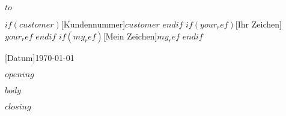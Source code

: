\documentclass[briefvorlage,
   parskip=half,%
   fromfax=on,%
   fromemail=on,%
   locfield=wide,%
   draft=false%
]{scrlttr2}
\begin{document}
 \begin{letter}{
     $to$
 }  


$if(customer)$[\normalfont Kundennummer]{$customer$} $endif$
$if(your_ref)$[\normalfont Ihr Zeichen] {$your_ref$} $endif$
$if(my_ref)$[\normalfont Mein Zeichen]{$my_ref$} $endif$

[\normalfont Datum]{\today}
\opening{$opening$}

$body$

\closing{$closing$}
\end{letter}
 
\end{document}
